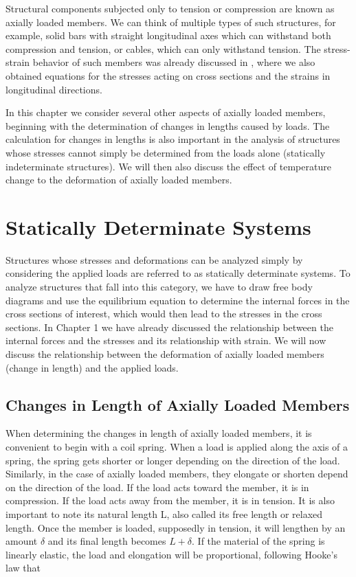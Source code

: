 \documentclass[
fontsize=10pt,
a4paper,
twosides=false,
open=any,
svgnames,
]{kaobook} %
\begin{document}
Structural components subjected only to tension or compression are known as axially loaded members. We can think of multiple types of such structures, for example, solid bars with straight longitudinal axes which can withstand both compression and tension, or cables, which can only withstand tension. The stress-strain behavior of such members was already discussed in , where we also obtained equations for the stresses acting on cross sections and the strains in longitudinal directions.

In this chapter we consider several other aspects of axially loaded members, beginning with the determination of changes in lengths caused by loads. The calculation for changes in lengths is also important in the analysis of structures whose stresses cannot simply be determined from the loads alone (statically indeterminate structures). We will then also discuss the effect of temperature change to the deformation of axially loaded members.


\section{Statically Determinate Systems}

Structures whose stresses and deformations can be analyzed simply by considering the applied loads are referred to as statically determinate systems. To analyze structures that fall into this category, we have to draw free body diagrams and use the equilibrium equation to determine the internal forces in the cross sections of interest, which would then lead to the stresses in the cross sections. In Chapter 1 we have already discussed the relationship between the internal forces and the stresses and its relationship with strain. We will now discuss the relationship between the deformation of axially loaded members (change in length) and the applied loads.

\subsection{Changes in Length of Axially Loaded Members}

When determining the changes in length of axially loaded members, it is convenient to begin with a coil spring. When a load is applied along the axis of a spring, the spring gets shorter or longer depending on the direction of the load.
Similarly, in the case of axially loaded members, they elongate or shorten depend on the direction of the load. If the load acts toward the member, it is in compression. If the load acts away from the member, it is in tension. It is also important to note its natural length L, also called its free length or relaxed length. Once the member is loaded, supposedly in tension, it will lengthen by an amount $\delta$ and its final length becomes $L + \delta$. If the material of the spring is linearly elastic, the load and elongation will be proportional, following Hooke’s law that
\end{document}
